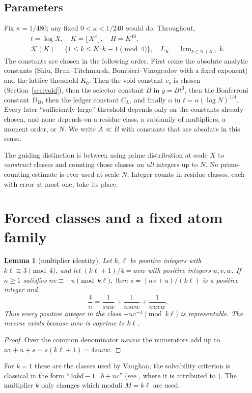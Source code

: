 \documentclass[10pt,reqno]{amsart}
\newtheorem{lemma}[theorem]{Lemma}
\theoremstyle{remark}
\newcommand{\K}{\mathcal K}
\newcommand{\lcm}{\operatorname{lcm}}
\begin{document}
\subsection*{Parameters}
Fix $\kappa=1/480$; any fixed $0<\kappa<1/240$ would do.  Throughout,
\begin{equation}\label{eq:parameters}
 \begin{gathered}
 t=\log X,\quad K=\lfloor X^\kappa\rfloor,\quad H=K^{10},\\
 \K(K)=\{1\leq k\leq K:k\equiv1\pmod4\},\quad
 L_K=\lcm_{k\in\K(K)}k.
 \end{gathered}
\end{equation}
The constants are chosen in the following order.  First come the absolute
analytic constants (Shiu, Brun--Titchmarsh, Bombieri--Vinogradov with a
fixed exponent) and the lattice threshold $K_0$.  Then the void constant
$c_v$ is chosen (Section~\ref{sec:void}), then the selector constant $B$
in $y=Bt^3$, then the Bonferroni constant $D_B$, then the ledger constant
$C_L$, and finally $\alpha$ in $t=\alpha(\log N)^{1/4}$.  Every later
``sufficiently large'' threshold depends only on the constants already
chosen, and none depends on a residue class, a subfamily of multipliers,
a moment order, or $N$.  We write $A\ll B$ with constants that are
absolute in this sense.

The guiding distinction is between using prime distribution at scale $X$
to \emph{construct} classes and counting those classes on \emph{all}
integers up to $N$.  No prime-counting estimate is ever used at scale $N$.
Integer counts in residue classes, each with error at most one, take its
place.

\section{Forced classes and a fixed atom family}\label{sec:atoms}
\begin{lemma}[multiplier identity]\label{lem:identity}
Let $k,\ell$ be positive integers with $k\ell\equiv3\pmod4$, and let
$(k\ell+1)/4=uvw$ with positive integers $u,v,w$.  If $n\geq1$ satisfies
$nv\equiv-u\pmod{k\ell}$, then $s=(nv+u)/(k\ell)$ is a positive integer and
\[
 \frac4n=\frac1{suw}+\frac1{nsvw}+\frac1{nuvw}.
\]
Thus every positive integer in the class $-uv^{-1}\pmod{k\ell}$ is
representable.  The inverse exists because $uvw$ is coprime to $k\ell$.
\end{lemma}
\begin{proof}
Over the common denominator $nsuvw$ the numerators add up to
$nv+u+s=s(k\ell+1)=4suvw$.
\end{proof}
For $k=1$ these are the classes used by Vaughan; the solvability criterion
is classical in the form ``$4abd-1\mid b+nc$'' (see \cite[Prop.~2.7]{ET},
where it is attributed to \cite{Vaughan}).  The multiplier $k$ only changes
which moduli $M=k\ell$ are used.
\end{document}
